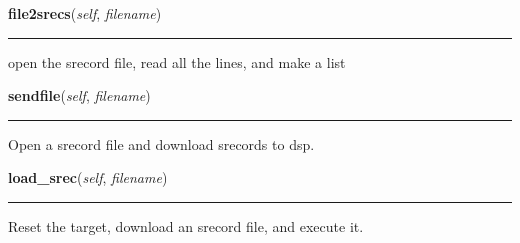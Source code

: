     \label{sload:sloader:file2srecs}

    \vspace{0.5ex}

    \begin{boxedminipage}{\textwidth}

    \raggedright \textbf{file2srecs}(\textit{self}, \textit{filename})

    \vspace{-1.5ex}

    \rule{\textwidth}{0.5\fboxrule}
    open the srecord file, read all the lines, and make a list

    \vspace{1ex}

    \end{boxedminipage}

    \label{sload:sloader:sendfile}

    \vspace{0.5ex}

    \begin{boxedminipage}{\textwidth}

    \raggedright \textbf{sendfile}(\textit{self}, \textit{filename})

    \vspace{-1.5ex}

    \rule{\textwidth}{0.5\fboxrule}
    Open a srecord file and download srecords to dsp.

    \vspace{1ex}

    \end{boxedminipage}

    \label{sload:sloader:load_srec}

    \vspace{0.5ex}

    \begin{boxedminipage}{\textwidth}

    \raggedright \textbf{load\_srec}(\textit{self}, \textit{filename})

    \vspace{-1.5ex}

    \rule{\textwidth}{0.5\fboxrule}
    Reset the target, download an srecord file, and execute it.

    \vspace{1ex}

    \end{boxedminipage}


